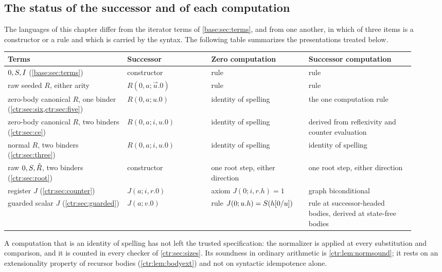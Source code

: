 \subsection{The status of the successor and of each computation}

The languages of this chapter differ from the iterator terms of \cref{base:sec:terms}, and
from one another, in which of three items is a constructor or a rule and which is carried by
the syntax. The following table summarizes the presentations treated below.
\begin{center}
\small
\begin{tabular}{@{}p{0.27\linewidth}p{0.19\linewidth}p{0.22\linewidth}p{0.24\linewidth}@{}}
\toprule
Terms & Successor & Zero computation & Successor computation\\
\midrule
$0,S,I$ (\cref{base:sec:terms}) & constructor & rule & rule\\
raw seeded $R$, either arity & $R(0,a;\vec u.0)$ & rule & rule\\
zero-body canonical $R$, one binder (\cref{ctr:sec:six,ctr:sec:five}) & $R(0,a;u.0)$ &
identity of spelling & the one computation rule\\
zero-body canonical $R$, two binders (\cref{ctr:sec:ce}) & $R(0,a;i,u.0)$ &
identity of spelling & derived from reflexivity and counter evaluation\\
normal $R$, two binders (\cref{ctr:sec:three}) & $R(0,a;i,u.0)$ & identity of spelling &
identity of spelling\\
raw $0,S,\hat R$, two binders (\cref{ctr:sec:root}) & constructor & one root step, either
direction & one root step, either direction\\
register $J$ (\cref{ctr:sec:counter}) & $J(a;i,r.0)$ & axiom $J(0;i,r.h)=1$ &
graph biconditional\\
guarded scalar $J$ (\cref{ctr:sec:guarded}) & $J(a;v.0)$ & rule
$J(0;u.h)=S(h[0/u])$ & rule at successor-headed bodies, derived at state-free
bodies\\
\bottomrule
\end{tabular}
\end{center}
A computation that is an identity of spelling has not left the trusted specification: the
normalizer is applied at every substitution and comparison, and it is counted in every
checker of \cref{ctr:sec:sizes}. Its soundness in ordinary arithmetic is
\cref{ctr:lem:normsound}; it rests on an extensionality property of recursor bodies
(\cref{ctr:lem:bodyext}) and not on syntactic idempotence alone.

